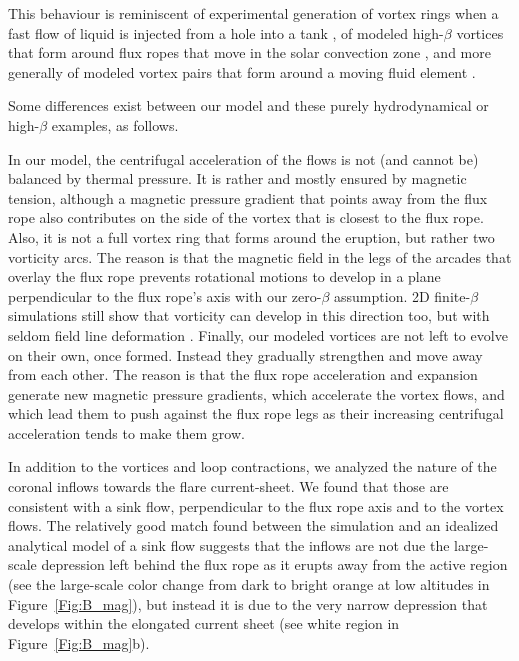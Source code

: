 \documentclass[apj]{emulateapj}
\begin{document}
This behaviour is reminiscent of experimental generation of vortex rings 
when a fast flow of liquid is injected from a hole into a tank \citep{Gle1988,Sul2008}, 
of modeled high-$\beta$ vortices that form around flux ropes that move 
in the solar convection zone \citep{Emo1998,Jouve09}, and more generally of modeled vortex 
pairs that form around a moving fluid element \citep[][ Figures 
9.7-9.8 pages 367-368]{Belmont2013}. 

Some differences exist between our model and these purely hydrodynamical or high-$\beta$ examples, as
follows. 

In our model, the centrifugal acceleration of the flows is not (and cannot 
be) balanced by thermal pressure. It is rather and mostly ensured by magnetic 
tension, although a magnetic pressure gradient that points away from the 
flux rope also contributes on the side of the vortex that is closest to 
the flux rope. Also, it is not a full vortex ring that forms around the 
eruption, but rather two vorticity arcs. The reason is that the magnetic 
field in the legs of the arcades that overlay the flux rope prevents 
rotational motions to develop in a plane perpendicular to the flux rope's axis 
with  our zero-$\beta$ assumption. 2D finite-$\beta$ simulations still 
show that vorticity can develop in this direction too, but with seldom 
field line deformation \citep{For1990,Wang2009}. Finally, our modeled 
vortices are not left to evolve on their own, once formed. Instead 
they gradually strengthen and move away from each other. The reason 
is that the flux rope acceleration and expansion generate new magnetic 
pressure gradients, which accelerate the vortex flows, and which lead 
them to push against the flux rope legs as their increasing centrifugal 
acceleration tends to make them grow. 

In addition to the vortices and loop contractions, we analyzed the nature of the coronal 
inflows towards the flare current-sheet. We found that those are 
consistent with a sink flow, perpendicular to the flux rope axis and 
to the vortex flows. The relatively good match found between the simulation 
and an idealized analytical model of a sink flow suggests that the inflows 
are not due the large-scale depression left behind the flux rope as it 
erupts away from the active region (see the large-scale color change from 
dark to bright orange at low altitudes in Figure~\ref{Fig:B_mag}), but instead it is due to the very narrow depression that develops within the elongated current 
sheet (see white region in Figure~\ref{Fig:B_mag}b). 
\end{document}
